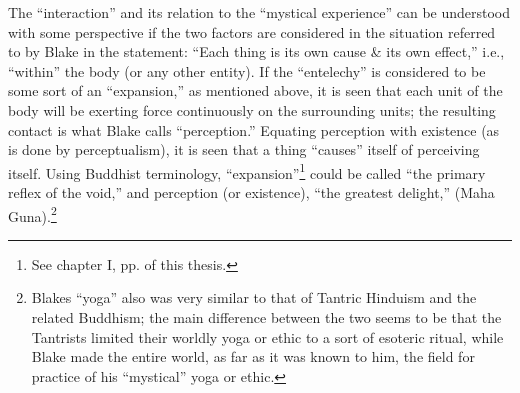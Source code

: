 The \enquote{interaction} and its relation to the \enquote{mystical experience} can be understood with some perspective if the two factors
are considered in the situation referred to by Blake in the statement: \enquote{Each thing is its own cause \& its own effect,}\supercite{keynes:william-blake}
i.e., \enquote{within} the body (or any other entity). If the
\enquote{entelechy} is considered to be some sort of an \enquote{expansion,} as mentioned above, it is seen that each unit of the body will be exerting force continuously on the surrounding
units; the resulting contact is what Blake calls \enquote{perception.} Equating perception with existence (as is done by perceptualism), it is seen that a thing
\enquote{causes} itself of perceiving itself. Using Buddhist terminology, \enquote{expansion}\footnote{See chapter I, pp. \pageref{self:27} of this thesis.}
could be called \enquote{the primary reflex of the void,} and perception (or existence), \enquote{the greatest delight,} (Maha Guna).\footnote{Blakes \enquote{yoga} also was very similar to that of Tantric Hinduism and the related Buddhism; the main difference between the two seems to be that the Tantrists limited their worldly yoga or ethic to a sort of esoteric ritual, while Blake made the entire world, as far as it was known to him, the field for practice of his \enquote{mystical} yoga or ethic.}

